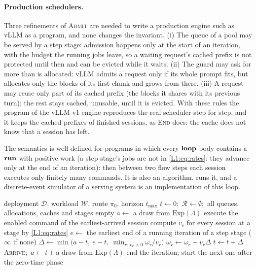 \paragraph{Production schedulers.} Three refinements of \textsc{Admit} are
needed to write a production engine such as vLLM as a program, and none
changes the invariant. (i) The queue of a pool may be served by a step
stage: admission happens only at the start of an iteration, with the budget
the running jobs leave, so a waiting request's cached prefix is not
protected until then and can be evicted while it waits. (ii) The guard may
ask for more than is allocated: vLLM admits a request only if its whole
prompt fits, but allocates only the blocks of its first chunk and grows
from there. (iii) A request may reuse only part of its cached prefix (the
blocks it shares with its previous turn); the rest stays cached, unusable,
until it is evicted. With these rules the program of the vLLM v1 engine
reproduces the real scheduler step for step, and it keeps the cached
prefixes of finished sessions, as \textsc{End} does: the cache does not
know that a session has left.

The semantics is well defined for programs in which every $\mathbf{loop}$ body contains a
$\mathbf{run}$ with positive work (a step stage's jobs are not in \eqref{L1:eq:rates}: they
advance only at the end of an iteration): then between two flow steps each session executes only
finitely many commands. It is also an algorithm.  runs it, and a
discrete-event simulator of a serving system is an implementation of this loop.

\begin{algorithm}[t]
\caption{Interpreter of a \textsc{Route} program up to time $t_{\max}$}\label{alg:route}
\begin{algorithmic}[1]
\Require deployment $\mathcal D$, workload $\mathcal W$, route $\pi_0$, horizon $t_{\max}$
\State $t\gets0$;\ $\mathcal R\gets\emptyset$;\ all queues, allocations, caches and stages empty
\State $a\gets$ a draw from $\mathrm{Exp}(\Lambda)$ 
   
    \State execute the enabled command of the earliest-arrived session
  \EndWhile
  \State compute $v_r$ for every session at a stage by \eqref{L1:eq:rates}
  \State $e\gets$ the earliest end of a running iteration of a step stage ($\infty$ if none)
  \State $\Delta\gets\min\bigl(a-t,\ e-t,\ \min_{r:\,v_r>0}\omega_r/v_r\bigr)$
    \State $\omega_r\gets\omega_r-v_r\Delta$
  \EndFor
  \State $t\gets t+\Delta$
    \State \textsc{Arrive};\ $a\gets t+{}$a draw from $\mathrm{Exp}(\Lambda)$
  \EndIf
   
    \State end the iteration; start the next one after the zero-time phase
  \EndIf
\EndWhile
\end{algorithmic}
\end{algorithm}

